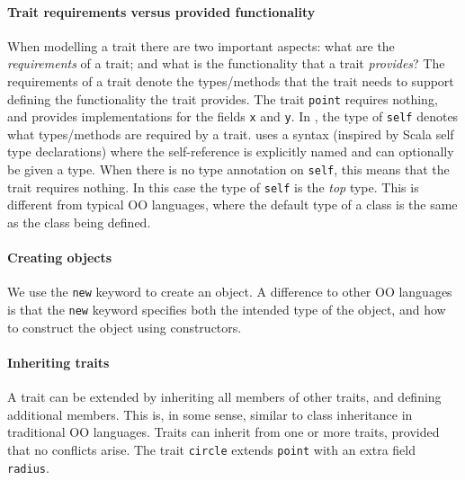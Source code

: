 \paragraph{Trait requirements versus provided functionality}
When modelling a trait there are two important aspects: what are the
\emph{requirements} of a trait; and what is the functionality that a trait
\emph{provides}? The requirements of a trait denote the types/methods that the
trait needs to support defining the functionality the trait provides. The trait
\lstinline{point} requires nothing, and provides implementations for the fields
\lstinline{x} and \lstinline{y}. In \name, the type of \lstinline$self$ denotes
what types/methods are required by a trait. \name uses a syntax (inspired by
Scala self type declarations) where the self-reference is explicitly named and
can optionally be given a type. When there is no type annotation on
\lstinline{self}, this means that the trait requires nothing. In this case the
type of \lstinline{self} is the \emph{top} type. This is different from typical
OO languages, where the default type of a class is the same as the class being
defined.


\paragraph{Creating objects}
We use the \lstinline{new} keyword to create an object. A difference to other OO
languages is that the \lstinline{new} keyword specifies both the intended type
of the object, and how to construct the object using constructors.

\paragraph{Inheriting traits}
A trait can be extended by inheriting all members of
other traits, and defining additional members. This is, in some sense, similar
to class inheritance in traditional OO languages. Traits can inherit
from one or more traits, provided that
no conflicts arise. The trait \lstinline$circle$ extends
\lstinline{point} with an extra field \lstinline{radius}.

